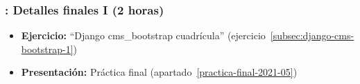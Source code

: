 \documentclass[a4paper,12pt]{article}
\begin{document}
 \subsubsection{\juevesN: Detalles finales I  (2 horas)}
 \label{cal:juevesN}

 \begin{itemize}
   \item \textbf{Ejercicio:} ``Django cms\_bootstrap cuadrícula'' (ejercicio~\ref{subsec:django-cms-bootstrap-1})
   \item \textbf{Presentación:} Práctica final (apartado~\ref{practica-final-2021-05})
\end{itemize}




\end{document}
